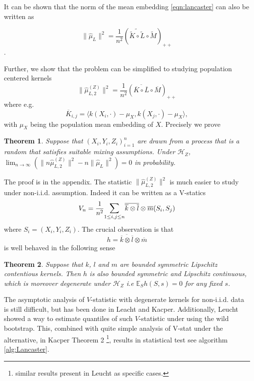 \documentclass[]{article}
\newtheorem{theorem}{Theorem}
\begin{document}
It can be shown that the norm of the mean embedding \eqref{eqn:lancaster} can also be written as

\[ \|\hat \mu_L\|^2 = \frac{1}{n^2}\left(\widetilde{\tilde{K}\circ\tilde{L}}\circ\tilde{M}\right)_{++}\].

Further, we show that the problem can be simplified to studying population centered kernels
\[
\| \hat \mu^{(Z)}_{L,2} \|^2 =\frac{1}{n^2}\left(\overline{\overline{K}\circ\overline{L}}\circ\overline{M}\right)_{++}
\]
where e.g. 
\[
\overline{K}_{i,j} = \langle k(X_i,\cdot)-\mu_X, k(X_j,\cdot) -\mu_X \rangle,
\]
with $\mu_X$ being the population mean embedding of $X$. Precisely we prove
\begin{theorem}\label{theorem:norm-conv-in-prob} Suppose that $(X_i,Y_i,Z_i)_{i=1}^n$ are drawn from a process that is a random that satisfies suitable mixing assumptions. Under $\mathcal{H}_Z$, $\lim_{n \to \infty} ( \| n\hat \mu^{(Z)}_{L,2} \|^2 - n\|\hat \mu_L\|^2 ) =0 $ in probability.
\end{theorem}
The proof is in the appendix. The statistic $\| \hat \mu^{(Z)}_{L,2} \|^2$ is much easier to study under non-i.i.d.  assumption. Indeed it can be written as a V-statics 
\[ 
V_n = \frac{1}{n^2} \mathlarger{\sum}_{1\leq i,j \leq n} \overline{\overline{k} \otimes \overline{l}}\otimes \overline{m} (S_i,S_j)
\]
where  $S_i = (X_i,Y_i,Z_i)$. The crucial observation is that
\[
 h = \overline{\overline{k} \otimes \overline{l}}\otimes \overline{m}
\]
is well behaved in the following sense 
\begin{theorem}\label{theorem:degenerate-kernel}
Suppose that $k$, $l$ and $m$ are bounded symmetric Lipschitz contentious kernels. Then $h$ is also bounded symmetric and Lipschitz continuous, which is moreover degenerate under $\mathcal{H}_Z$ i.e $\mathbb{E}_{S}h(S,s)=0$ for any fixed $s$.
\end{theorem}
The asymptotic analysis of $V$-statistic with degenerate kernels for non-i.i.d. data  is still difficult, but has been done in Leacht and Kacper. Additionally, Leucht showed a way to estimate quantiles of such $V$-statistic under using the  wild bootstrap. This, combined with quite simple analysis of V-stat under the alternative, in Kacper Theorem 2 \footnote{similar results present in Leucht as specific cases.}, results in statistical test see algorithm \ref{alg:Lancaster}.
\end{document}
